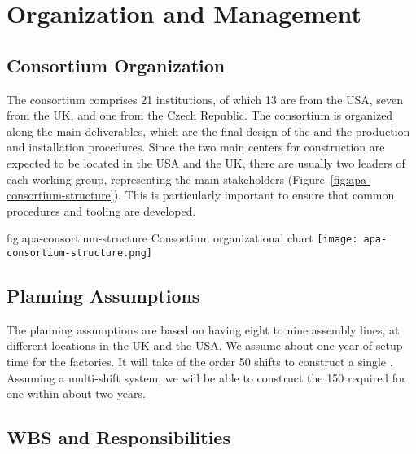 \section{Organization and Management}
\label{sec:fdsp-apa-org}

\subsection{ Consortium Organization}
\label{sec:fdsp-apa-org-consortium}

The  consortium comprises \num{21} institutions, of which \num{13} are from the USA, seven from the UK, and one from the Czech Republic. The consortium is organized along the main deliverables, which are the final design of the  and the  production and installation procedures. Since the two main centers for  construction are expected to be located in the USA and the UK, there are usually two leaders of each working group, representing the main stakeholders (Figure~\ref{fig:apa-consortium-structure}). This is particularly important to ensure that common procedures and tooling are developed. 

\begin{dunefigure}{fig:apa-consortium-structure}
{ Consortium organizational chart}
\texttt{[image: apa-consortium-structure.png]}
\end{dunefigure}


\subsection{Planning Assumptions}
\label{sec:fdsp-apa-org-assmp}

The planning assumptions are based on having eight to nine  assembly lines, at different locations in the UK and the USA. 
We assume about one year of setup time for the factories.
It will take of the order \num{50} shifts to construct a single . Assuming a multi-shift system, we will be able to construct the \num{150}  required for one  %
within about two years.

\subsection{WBS and Responsibilities}
\label{sec:fdsp-apa-org-wbs}

